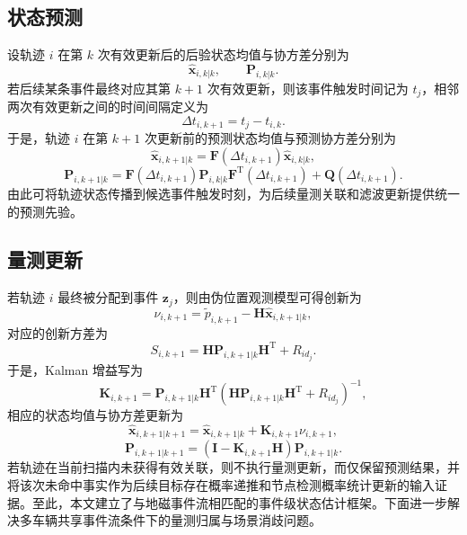 \documentclass{xdupgthesis}
\begin{document}
\subsection{状态预测}

设轨迹 $i$ 在第 $k$ 次有效更新后的后验状态均值与协方差分别为
\begin{equation}
	\hat{\mathbf x}_{i,k|k},
	\qquad
	\mathbf P_{i,k|k}.
	\label{eq:ch3_post_state}
\end{equation}
若后续某条事件最终对应其第 $k+1$ 次有效更新，则该事件触发时间记为 $t_j$，相邻两次有效更新之间的时间间隔定义为
\begin{equation}
	\Delta t_{i,k+1}=t_j-t_{i,k}.
	\label{eq:ch3_dt_update}
\end{equation}
于是，轨迹 $i$ 在第 $k+1$ 次更新前的预测状态均值与预测协方差分别为
\begin{equation}
	\hat{\mathbf x}_{i,k+1|k}
	=
	\mathbf F\left(\Delta t_{i,k+1}\right)\hat{\mathbf x}_{i,k|k},
	\label{eq:ch3_predict_state}
\end{equation}
\begin{equation}
	\mathbf P_{i,k+1|k}
	=
	\mathbf F\left(\Delta t_{i,k+1}\right)
	\mathbf P_{i,k|k}
	\mathbf F^{\mathrm T}\left(\Delta t_{i,k+1}\right)
	+
	\mathbf Q\left(\Delta t_{i,k+1}\right).
	\label{eq:ch3_predict_cov}
\end{equation}
由此可将轨迹状态传播到候选事件触发时刻，为后续量测关联和滤波更新提供统一的预测先验。

\subsection{量测更新}

若轨迹 $i$ 最终被分配到事件 $\mathbf z_j$，则由伪位置观测模型可得创新为
\begin{equation}
	\nu_{i,k+1}=\tilde p_{i,k+1}-\mathbf H\hat{\mathbf x}_{i,k+1|k},
	\label{eq:ch3_innovation_event}
\end{equation}
对应的创新方差为
\begin{equation}
	S_{i,k+1}=\mathbf H\mathbf P_{i,k+1|k}\mathbf H^{\mathrm T}+R_{id_j}.
	\label{eq:ch3_S_event}
\end{equation}
于是，Kalman 增益写为
\begin{equation}
	\mathbf K_{i,k+1}
	=
	\mathbf P_{i,k+1|k}\mathbf H^{\mathrm T}
	\left(
	\mathbf H\mathbf P_{i,k+1|k}\mathbf H^{\mathrm T}+R_{id_j}
	\right)^{-1},
	\label{eq:ch3_K_event}
\end{equation}
相应的状态均值与协方差更新为
\begin{equation}
	\hat{\mathbf x}_{i,k+1|k+1}
	=
	\hat{\mathbf x}_{i,k+1|k}
	+
	\mathbf K_{i,k+1}\nu_{i,k+1},
	\label{eq:ch3_update_state_event}
\end{equation}
\begin{equation}
	\mathbf P_{i,k+1|k+1}
	=
	\left(\mathbf I-\mathbf K_{i,k+1}\mathbf H\right)\mathbf P_{i,k+1|k}.
	\label{eq:ch3_update_cov_event}
\end{equation}
若轨迹在当前扫描内未获得有效关联，则不执行量测更新，而仅保留预测结果，并将该次未命中事实作为后续目标存在概率递推和节点检测概率统计更新的输入证据。至此，本文建立了与地磁事件流相匹配的事件级状态估计框架。下面进一步解决多车辆共享事件流条件下的量测归属与场景消歧问题。
\end{document}
